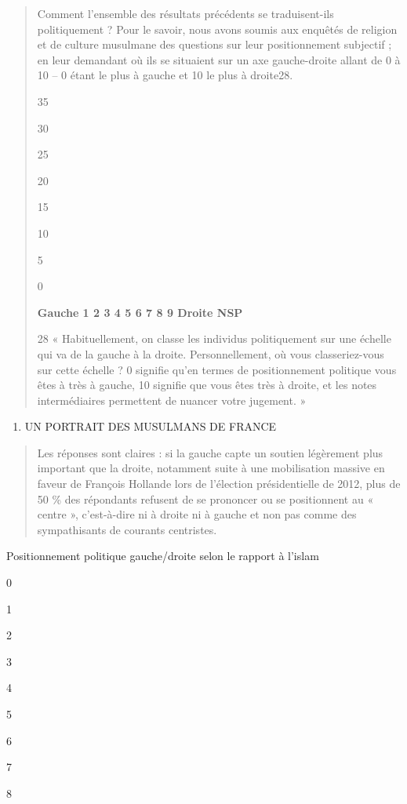 \begin{quote}
Comment l'ensemble des résultats précédents se traduisent-ils
politiquement ? Pour le savoir, nous avons soumis aux enquêtés de
religion et de culture musulmane des questions sur leur positionnement
subjectif ; en leur demandant où ils se situaient sur un axe
gauche-droite allant de 0 à 10 -- 0 étant le plus à gauche et 10 le plus
à droite28.

35

30

25

20

15

10

5

0

\textbf{Gauche 1 2 3 4 5 6 7 8 9 Droite NSP}

28 « Habituellement, on classe les individus politiquement sur une
échelle qui va de la gauche à la droite. Personnellement, où vous
classeriez-vous sur cette échelle ? 0 signifie qu'en termes de
positionnement politique vous êtes à très à gauche, 10 signifie que vous
êtes très à droite, et les notes intermédiaires permettent de nuancer
votre jugement. »
\end{quote}

\begin{enumerate}
\def\labelenumi{\Roman{enumi}.}
\item
  UN PORTRAIT DES MUSULMANS DE FRANCE
\end{enumerate}

\begin{quote}
Les réponses sont claires : si la gauche capte un soutien légèrement
plus important que la droite, notamment suite à une mobilisation massive
en faveur de François Hollande lors de l'élection présidentielle de
2012, plus de 50 \% des répondants refusent de se prononcer ou se
positionnent au « centre », c'est-à-dire ni à droite ni à gauche et non
pas comme des sympathisants de courants centristes.
\end{quote}

Positionnement politique gauche/droite selon le rapport à l'islam

0

1

2

3

4

5

6

7

8

